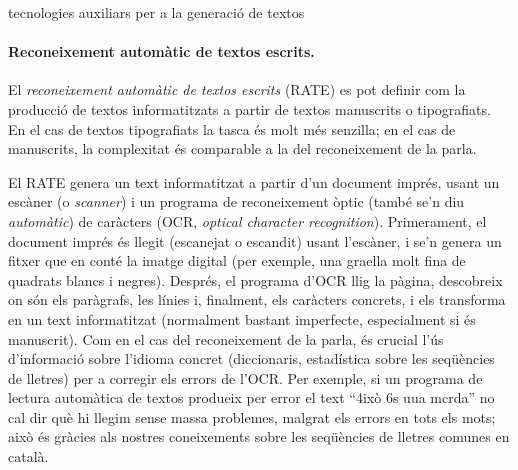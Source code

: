 \begin{persabermes}{tecnologies auxiliars per a la generació de textos}
  \paragraph{Reconeixement automàtic de textos escrits.}
  El \emph{reconeixement automàtic de textos escrits} (RATE) es pot
  definir com la producció de textos informatitzats a partir de textos
  manuscrits o tipografiats. En el cas de textos tipografiats la tasca
  és molt més senzilla; en el cas de manuscrits, la complexitat és
  comparable a la del reconeixement de la parla.
  
  El RATE genera un text informatitzat a partir d'un document imprés,
  usant un escàner (o \emph{scanner}) i un programa de reconeixement
  òptic (també se'n diu {\em automàtic}) de caràcters (OCR,
  \emph{optical character recognition}).  Primerament, el document
  imprés és llegit (escanejat o escandit) usant l'escàner, i se'n
  genera un fitxer que en conté la imatge digital (per exemple, una
  graella molt fina de quadrats blancs i negres).  Després, el
  programa d'OCR llig la pàgina, descobreix on són els paràgrafs, les
  línies i, finalment, els caràcters concrets, i els transforma en un
  text informatitzat (normalment bastant imperfecte, especialment si
  és manuscrit).  Com en el cas del reconeixement de la parla, és
  crucial l'ús d'informació sobre l'idioma concret (diccionaris,
  estadística sobre les seqüències de lletres) per a corregir els
  errors de l'OCR.  Per exemple, si un programa de lectura automàtica
  de textos produeix per error el text ``4ixò 6s uua mcrda'' no cal
  dir què hi llegim sense massa problemes, malgrat els errors en tots
  els mots; això és gràcies als nostres coneixements sobre les
  seqüències de lletres comunes en català.

\mbox{}
\end{persabermes}





